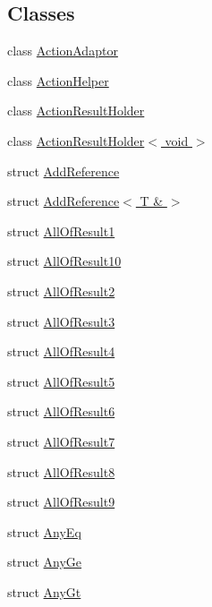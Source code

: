 \subsection*{Classes}
\begin{DoxyCompactItemize}
\item 
class \hyperlink{classtesting_1_1internal_1_1ActionAdaptor}{Action\+Adaptor}
\item 
class \hyperlink{classtesting_1_1internal_1_1ActionHelper}{Action\+Helper}
\item 
class \hyperlink{classtesting_1_1internal_1_1ActionResultHolder}{Action\+Result\+Holder}
\item 
class \hyperlink{classtesting_1_1internal_1_1ActionResultHolder_3_01void_01_4}{Action\+Result\+Holder$<$ void $>$}
\item 
struct \hyperlink{structtesting_1_1internal_1_1AddReference}{Add\+Reference}
\item 
struct \hyperlink{structtesting_1_1internal_1_1AddReference_3_01T_01_6_01_4}{Add\+Reference$<$ T \& $>$}
\item 
struct \hyperlink{structtesting_1_1internal_1_1AllOfResult1}{All\+Of\+Result1}
\item 
struct \hyperlink{structtesting_1_1internal_1_1AllOfResult10}{All\+Of\+Result10}
\item 
struct \hyperlink{structtesting_1_1internal_1_1AllOfResult2}{All\+Of\+Result2}
\item 
struct \hyperlink{structtesting_1_1internal_1_1AllOfResult3}{All\+Of\+Result3}
\item 
struct \hyperlink{structtesting_1_1internal_1_1AllOfResult4}{All\+Of\+Result4}
\item 
struct \hyperlink{structtesting_1_1internal_1_1AllOfResult5}{All\+Of\+Result5}
\item 
struct \hyperlink{structtesting_1_1internal_1_1AllOfResult6}{All\+Of\+Result6}
\item 
struct \hyperlink{structtesting_1_1internal_1_1AllOfResult7}{All\+Of\+Result7}
\item 
struct \hyperlink{structtesting_1_1internal_1_1AllOfResult8}{All\+Of\+Result8}
\item 
struct \hyperlink{structtesting_1_1internal_1_1AllOfResult9}{All\+Of\+Result9}
\item 
struct \hyperlink{structtesting_1_1internal_1_1AnyEq}{Any\+Eq}
\item 
struct \hyperlink{structtesting_1_1internal_1_1AnyGe}{Any\+Ge}
\item 
struct \hyperlink{structtesting_1_1internal_1_1AnyGt}{Any\+Gt}

\end{DoxyCompactItemize}
